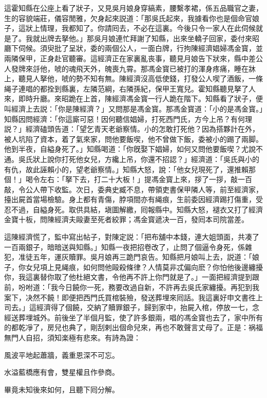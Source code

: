 這霍知縣在公座上看了狀子，又見吳月娘身穿縞素，腰繫孝裙，係五品職官之妻，生的容貌端莊，儀容閒雅，欠身起來説道：「那吳氏起來，我據看你也是個命官娘子，這狀上情理，我都知了。你請囘去，不必在這裏。今後只令一家人在此伺候就是了。我就出牌去拏他。」那吳月娘連忙拜謝了知縣，出來坐轎子回家，委付來昭廳下伺候。須臾批了呈狀，委的兩個公人，一面白牌，行拘陳經濟娼婦馮金寳，並兩隣保甲，正身赴官聽審。這經濟正在家裏亂丧事，聽見月娘告下狀來，縣中差公人發牌來㧱他，唬的魂飛天外，魄喪九霄。那馮金寳已被打的渾身疼痛，睡在牀上，聽見人拏他，唬的勢不知有無。陳經濟沒高低使錢，打發公人喫了酒飯，一條䋲子連唱的都拴到縣裏，左隣范綱，右隣孫紀，保甲王寬兒。霍知縣聽見拏了人來，即時升廳。來昭跪在上首，陳經濟馮金寳一行人跪在階下。知縣看了狀子，便叫經濟上去説：「你是陳經濟？」又問那是馮金寳。那馮金寳道：「小的是馮金寳。」知縣因問經濟：「你這廝可惡！因何聽信娼婦，打死西門氏，方今上吊？有何理説？」經濟磕頭告道：「望乞青天老爺察情。小的怎敢打死他？因為搭夥計在外，被人坑陷了資本，着了氣來家，問他要飯喫，他不曾做下飯，委被小的踢了兩脚。他到半夜，自縊身死了。」知縣喝道：「你旣娶下娼婦，如何又問他要飯喫？尤說不通。吳氏狀上說你打死他女兒，方纔上吊，你還不招認？」經濟道：「吳氏與小的有仇，故此誣賴小的，望老爺察情。」知縣大怒，說：「他女兒現死了，還推賴那個！」喝令左右：「拏下去，打二十大板！」提馮金寳上來，拶了一拶，敲一百敲，令公人帶下收監。次日，委典史臧不息，帶領吏書保甲隣人等，前至經濟家，擡出屍首當場檢驗。身上都有青傷，脖項間亦有䋲痕，生前委因經濟踢打傷重，受忍不過，自縊身死。取供具結，塡圖解繳，囘報縣中。知縣大怒，褪衣又打了經濟金寶十板，問陳經濟夫毆妻至死者絞罪；馮金寳遞决一百，發囘本司院當差。

這陳經濟慌了，監中寫出帖子，對陳定説：「把布舖中本錢，連大姐頭面，共凑了一百兩銀子，暗暗送與知縣。」知縣一夜把招卷改了，止問了個逼令身死，係雜犯，准徒五年，運灰贖罪。吳月娘再三跪門哀告。知縣把月娘叫上去，説道：「娘子，你女兒項上見䋲痕，如何問他毆殺條律？人情莫非忒偏向麽？你怕他後邊纏擾你，我這裏替你取了他杜絕文書，令他再不許上你門就是了。」一面把經濟提到跟前，吩咐道：「我今日饒你一死，務要改過自新，不許再去吳氏家纏擾。再犯到我案下，决然不饒！即便把西門氏買棺裝殮，發送葬埋來囘話。我這裏好申文書徃上司去。」這經濟得了個饒，交納了贖罪銀子，歸到家中，抬屍入棺，停放一七，念經送葬埋城外。前後坐了半個月監，使了許多銀兩，唱的馮金寳也去了，家中所有的都乾凈了，房兒也典了，剛刮剌出個命兒來，再也不敢聲言丈母了。正是：祸福無門人自招，須知楽極有悲來。有詩為證：

\begin{myquote}
風波平地起蕭牆，義重恩深不可忘。

水溢藍橋應有會，雙星權且作參商。
\end{myquote}

畢竟未知後來如何，且聽下囘分解。

